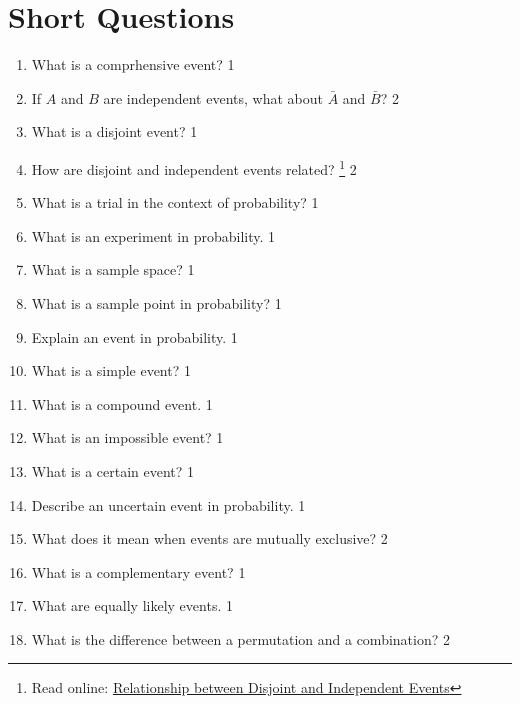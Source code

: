 \documentclass[a4paper,oneside, margin=1.4in]{book}
\begin{document}
\section{Short Questions}
 \begin{enumerate}
 
 \item What is a comprhensive event? \hfill 1
 \item If $A$ and $B$ are independent events, what about $\bar A$ and $\bar B$? \hfill 2
    \item
	What is a disjoint event? \hfill 1
    \item
	How are disjoint and independent events related? \footnote{Read online: \href{https://study.statmania.info/disjint-independent-relation.sm}{Relationship between Disjoint and Independent Events}}  \hfill 2

 
    \item What is a trial in the context of probability? \hfill 1

\item What is an experiment in probability. \hfill 1

\item What is a sample space? \hfill 1

\item What is a sample point in probability? \hfill 1

\item Explain an event in probability. \hfill 1

\item What is a simple event? \hfill 1

\item What is a compound event. \hfill 1

\item What is an impossible event? \hfill 1

\item What is a certain event? \hfill 1

\item Describe an uncertain event in probability. \hfill 1

\item What does it mean when events are mutually exclusive? \hfill 2

\item What is a complementary event? \hfill 1

\item What are equally likely events. \hfill 1

\item What is the difference between a permutation and a combination? \hfill 2


\end{enumerate}
\end{document}
